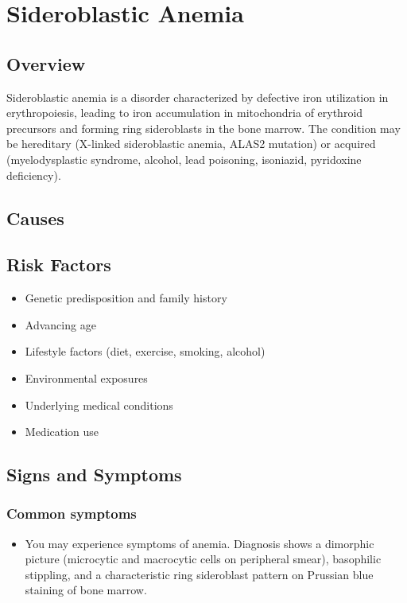 \chapter{Sideroblastic Anemia}
\label{sec:Sideroblastic Anemia}

\section{Overview}
Sideroblastic anemia is a disorder characterized by defective iron utilization in erythropoiesis, leading to iron accumulation in mitochondria of erythroid precursors and forming ring sideroblasts in the bone marrow. The condition may be hereditary (X-linked sideroblastic anemia, ALAS2 mutation) or acquired (myelodysplastic syndrome, alcohol, lead poisoning, isoniazid, pyridoxine deficiency).
\section{Causes}
\section{Risk Factors}

\begin{itemize}[noitemsep]
  \item Genetic predisposition and family history
  \item Advancing age
  \item Lifestyle factors (diet, exercise, smoking, alcohol)
  \item Environmental exposures
  \item Underlying medical conditions
  \item Medication use
\end{itemize}
\section{Signs and Symptoms}

\subsection{Common symptoms}
\begin{itemize}[noitemsep]
  \item You may experience symptoms of anemia. Diagnosis shows a dimorphic picture (microcytic and macrocytic cells on peripheral smear), basophilic stippling, and a characteristic ring sideroblast pattern on Prussian blue staining of bone marrow. 
  \end{itemize}

